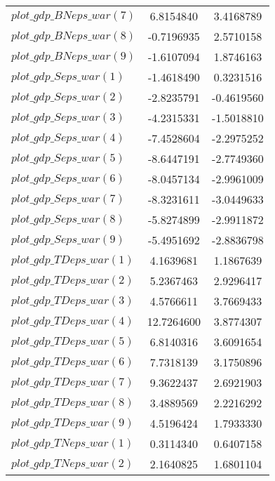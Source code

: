 \begin{center}
\begin{longtable}{lcc}
$plot\_gdp\_BN eps\_war (7)  $	 & 	      6.8154840	 & 	      3.4168789 \\ 
$plot\_gdp\_BN eps\_war (8)  $	 & 	     -0.7196935	 & 	      2.5710158 \\ 
$plot\_gdp\_BN eps\_war (9)  $	 & 	     -1.6107094	 & 	      1.8746163 \\ 
$plot\_gdp\_S eps\_war (1)   $	 & 	     -1.4618490	 & 	      0.3231516 \\ 
$plot\_gdp\_S eps\_war (2)   $	 & 	     -2.8235791	 & 	     -0.4619560 \\ 
$plot\_gdp\_S eps\_war (3)   $	 & 	     -4.2315331	 & 	     -1.5018810 \\ 
$plot\_gdp\_S eps\_war (4)   $	 & 	     -7.4528604	 & 	     -2.2975252 \\ 
$plot\_gdp\_S eps\_war (5)   $	 & 	     -8.6447191	 & 	     -2.7749360 \\ 
$plot\_gdp\_S eps\_war (6)   $	 & 	     -8.0457134	 & 	     -2.9961009 \\ 
$plot\_gdp\_S eps\_war (7)   $	 & 	     -8.3231611	 & 	     -3.0449633 \\ 
$plot\_gdp\_S eps\_war (8)   $	 & 	     -5.8274899	 & 	     -2.9911872 \\ 
$plot\_gdp\_S eps\_war (9)   $	 & 	     -5.4951692	 & 	     -2.8836798 \\ 
$plot\_gdp\_TD eps\_war (1)  $	 & 	      4.1639681	 & 	      1.1867639 \\ 
$plot\_gdp\_TD eps\_war (2)  $	 & 	      5.2367463	 & 	      2.9296417 \\ 
$plot\_gdp\_TD eps\_war (3)  $	 & 	      4.5766611	 & 	      3.7669433 \\ 
$plot\_gdp\_TD eps\_war (4)  $	 & 	     12.7264600	 & 	      3.8774307 \\ 
$plot\_gdp\_TD eps\_war (5)  $	 & 	      6.8140316	 & 	      3.6091654 \\ 
$plot\_gdp\_TD eps\_war (6)  $	 & 	      7.7318139	 & 	      3.1750896 \\ 
$plot\_gdp\_TD eps\_war (7)  $	 & 	      9.3622437	 & 	      2.6921903 \\ 
$plot\_gdp\_TD eps\_war (8)  $	 & 	      3.4889569	 & 	      2.2216292 \\ 
$plot\_gdp\_TD eps\_war (9)  $	 & 	      4.5196424	 & 	      1.7933330 \\ 
$plot\_gdp\_TN eps\_war (1)  $	 & 	      0.3114340	 & 	      0.6407158 \\ 
$plot\_gdp\_TN eps\_war (2)  $	 & 	      2.1640825	 & 	      1.6801104 \\ 

\end{longtable}
\end{center}
